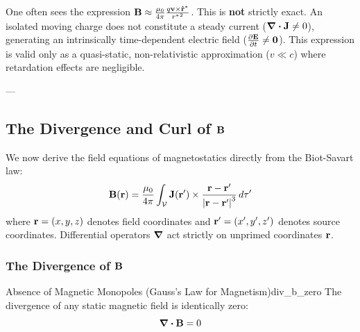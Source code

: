 \begin{remark}
One often sees the expression $\vb{B} \approx \frac{\mu_0}{4\pi} \frac{q \vb{v} \times \vu{r}^*}{{r^*}^2}$. This is \textbf{not} strictly exact. An isolated moving charge does not constitute a steady current ($\div\vb{J} \neq 0$), generating an intrinsically time-dependent electric field ($\pdv{\vb{E}}{t} \neq \vb{0}$). This expression is valid only as a quasi-static, non-relativistic approximation ($v \ll c$) where retardation effects are negligible.
\end{remark}

---

\subsection{The Divergence and Curl of $\vb{B}$}
\label{sec:div_curl_b}

We now derive the field equations of magnetostatics directly from the Biot-Savart law:
\begin{equation}
    \vb{B}(\vb{r}) = \frac{\mu_0}{4\pi} \int_{\mathcal{V}} \vb{J}(\vb{r}') \times \frac{\vb{r} - \vb{r}'}{\abs{\vb{r} - \vb{r}'}^3}\,d\tau'
\end{equation}
where $\vb{r} = (x,y,z)$ denotes field coordinates and $\vb{r}' = (x',y',z')$ denotes source coordinates. Differential operators $\grad$ act strictly on unprimed coordinates $\vb{r}$.

\subsubsection{The Divergence of $\vb{B}$}

\begin{theorem}{Absence of Magnetic Monopoles (Gauss's Law for Magnetism)}{div_b_zero}
The divergence of any static magnetic field is identically zero:
\begin{equation}
    \div\vb{B} = 0
\end{equation}
\end{theorem}

